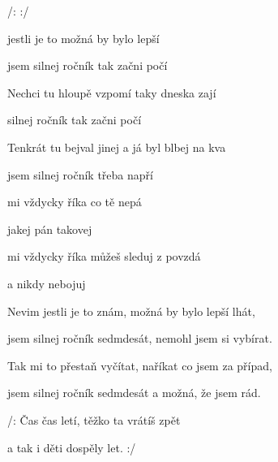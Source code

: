 

/:     :/

\zs

 jestli je to 
možná by bylo lepší 

jsem silnej ročník  tak začni počí

Nechci tu hloupě vzpomí taky dneska zají

silnej ročník  tak začni počí

Tenkrát tu bejval jinej  a já byl blbej na kva

jsem silnej ročník  třeba napří
\ks

\zr
{} mi vždycky říka co tě nepá

jakej pán takovej 

 mi vždycky říka můžeš sleduj z povzdá

a nikdy nebojuj 
\kr

\zs
Nevim jestli je to znám, možná by bylo lepší lhát,

jsem silnej ročník sedmdesát, nemohl jsem si vybírat.

Tak mi to přestaň vyčítat, naříkat co jsem za případ,

jsem silnej ročník sedmdesát a možná, že jsem rád.
\ks

\zr

\kr


\zs
/: Čas  čas letí, těžko ta  vrátíš zpět

a tak i  děti dospěly  let. :/
\ks

\kp






